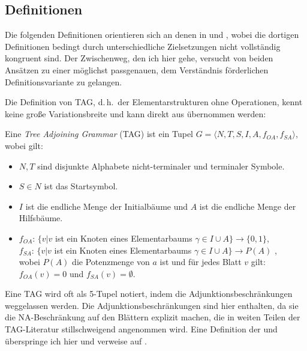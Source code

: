 \subsection{Definitionen}\label{sec-ttmctag-definitionen}

Die folgenden Definitionen orientieren sich an denen in \cite{Kallmeyer:05} und \cite{Kallmeyer:09}, wobei die dortigen Definitionen bedingt durch unterschiedliche Zielsetzungen nicht vollständig kongruent sind. Der Zwischenweg, den ich hier gehe, versucht von beiden Ansätzen zu einer möglichst passgenauen, dem Verständnis förderlichen Definitionsvariante zu gelangen. 

Die Definition von TAG, d.\,h.\ der Elementarstrukturen ohne Operationen, kennt keine gro\ss e Variationsbreite und kann direkt aus \cite{Kallmeyer:09} übernommen werden:   
\begin{definition}
Eine {\it Tree Adjoining Grammar} (TAG) ist ein Tupel $G = \langle N,T,S,I,A,f_{\mathit{OA}},f_{\mathit{SA}} \rangle$, wobei gilt:
\begin{itemize}
  \item $N,T$ sind disjunkte Alphabete nicht-terminaler und terminaler Symbole.
  \item $S \in N$ ist das Startsymbol.
  \item $I$ ist die endliche Menge der Initialbäume und $A$ ist die endliche Menge der Hilfsbäume.
  \item $f_{\mathit{OA}}$: $\{ v | v$ ist ein Knoten eines Elementarbaums $\gamma \in I \cup A \} \to \{0,1\}$, \\
        $f_{\mathit{SA}}$: $\{ v | v$ ist ein Knoten eines Elementarbaums $\gamma \in I \cup A \} \to P(A)$ ,\\
        wobei $P(A)$ die Potenzmenge von $a$ ist und für jedes Blatt $v$ gilt: $f_{\mathit{OA}}(v) = 0$ und $f_{\mathit{SA}}(v) = \emptyset$. 
\end{itemize}
\end{definition}
Eine TAG wird oft als 5-Tupel notiert, indem die Adjunktionsbeschränkungen weggelassen werden. Die Adjunktionsbeschränkungen sind hier enthalten, da sie die NA-Beschränkung auf den Blättern explizit machen, die in weiten Teilen der TAG-Literatur stillschweigend angenommen wird. Eine Definition der  und  überspringe ich hier und verweise auf \citet[59f]{Kallmeyer:09}.

